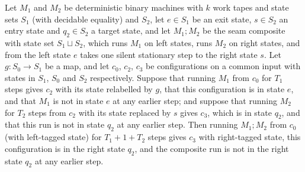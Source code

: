 \begin{theorem}
\label{Turing.un_step'}
\leanok
{}
Let $M_1$ and $M_2$ be deterministic binary machines with $k$ work tapes and state sets $S_1$
(with decidable equality) and $S_2$, let $e\in S_1$ be an exit state, $s\in S_2$ an entry state
and $q_2\in S_2$ a target state, and let $M_1;M_2$ be the seam composite with state set
$S_1\sqcup S_2$, which runs $M_1$ on left states, runs $M_2$ on right states, and from the left
state $e$ takes one silent stationary step to the right state $s$. Let $g:S_0\to S_1$ be a map,
and let $c_0$, $c_2$, $c_3$ be configurations on a common input with states in $S_1$, $S_0$ and
$S_2$ respectively. Suppose that running $M_1$ from $c_0$ for $T_1$ steps gives $c_2$ with its
state relabelled by $g$, that this configuration is in state $e$, and that $M_1$ is not in state
$e$ at any earlier step; and suppose that running $M_2$ for $T_2$ steps from $c_2$ with its state
replaced by $s$ gives $c_3$, which is in state $q_2$, and that this run is not in state $q_2$ at
any earlier step. Then running $M_1;M_2$ from $c_0$ (with left-tagged state) for $T_1+1+T_2$
steps gives $c_3$ with right-tagged state, this configuration is in the right state $q_2$, and
the composite run is not in the right state $q_2$ at any earlier step.
\end{theorem}

